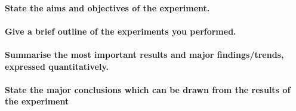 \paragraph{State the aims and objectives of the experiment.}

\paragraph{Give a brief outline of the experiments you performed.}

\paragraph{Summarise the most important results and major findings/trends, expressed quantitatively.}

\paragraph{State the major conclusions which can be drawn from the results of the experiment}